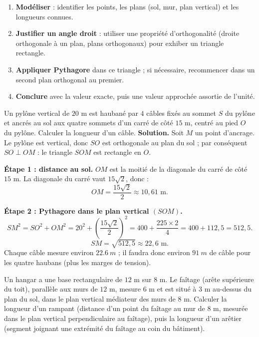 \documentclass[11pt]{article}
\newcounter{popsec}
\newcounter{popsub}
\newcommand{\courssub}[1]{%
  \stepcounter{popsub}%
  \par\vspace{9pt}\noindent{\popxbold\fontsize{11.5}{13}\selectfont\color{popink}{\color{poporange}\thepopsec.\thepopsub}\hspace{6pt}#1}\par\nopagebreak\vspace{4pt}
}
\begin{document}
\courssub{Résolution de problèmes concrets}

\begin{methode}
\begin{enumerate}
\item \textbf{Modéliser} : identifier les points, les plans (sol, mur, plan vertical) et les longueurs connues.
\item \textbf{Justifier un angle droit} : utiliser une propriété d'orthogonalité (droite orthogonale à un plan, plans orthogonaux) pour exhiber un triangle rectangle.
\item \textbf{Appliquer Pythagore} dans ce triangle ; si nécessaire, recommencer dans un second plan orthogonal au premier.
\item \textbf{Conclure} avec la valeur exacte, puis une valeur approchée assortie de l'unité.
\end{enumerate}
\end{methode}

\begin{exoresolu}
Un pylône vertical de $20$ m est haubané par $4$ câbles fixés au sommet $S$ du pylône et ancrés au sol aux quatre sommets d'un carré de côté $15$ m, centré au pied $O$ du pylône. Calculer la longueur d'un câble.
\tcblower
\textbf{Solution.} Soit $M$ un point d'ancrage. Le pylône est vertical, donc $SO$ est orthogonale au plan du sol ; par conséquent $SO \perp OM$ : le triangle $SOM$ est rectangle en $O$.

\textbf{Étape 1 : distance au sol.} $OM$ est la moitié de la diagonale du carré de côté $15$ m. La diagonale du carré vaut $15\sqrt{2}$, donc :
\[ OM = \frac{15\sqrt{2}}{2} \approx 10{,}61 \text{ m}. \]

\textbf{Étape 2 : Pythagore dans le plan vertical $(SOM)$.}
\[ SM^2 = SO^2 + OM^2 = 20^2 + \left(\frac{15\sqrt{2}}{2}\right)^2 = 400 + \frac{225 \times 2}{4} = 400 + 112{,}5 = 512{,}5. \]
\[ SM = \sqrt{512{,}5} \approx 22{,}6 \text{ m}. \]
Chaque câble mesure environ $\SI{22,6}{m}$ ; il faudra donc environ $\SI{91}{m}$ de câble pour les quatre haubans (plus les marges de tension).
\end{exoresolu}

\begin{exercice}
Un hangar a une base rectangulaire de $12$ m sur $8$ m. Le faîtage (arête supérieure du toit), parallèle aux murs de $12$ m, mesure $6$ m et est situé à $3$ m au-dessus du plan du sol, dans le plan vertical médiateur des murs de $8$ m. Calculer la longueur d'un rampant (distance d'un point du faîtage au mur de $8$ m, mesurée dans le plan vertical perpendiculaire au faîtage), puis la longueur d'un arêtier (segment joignant une extrémité du faîtage au coin du bâtiment).
\end{exercice}
\end{document}
